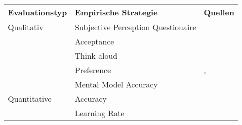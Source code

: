 \begin{table}[htb!]
    \begin{center}
        \begin{tabular}{|p{}|p{}|p{}|}
            \hline
            \textbf{Evaluationstyp} & \textbf{Empirische Strategie} & \textbf{Quellen} \\ \hline
            Qualitativ  & Subjective Perception Questionaire &  \cite{balog_measuring_2020} \cite{sato_context_nodate}
                                                                \cite{waa_evaluating_2021} \cite{eiband_impact_2019}  \cite{kouki_user_2017} \cite{tsai_evaluating_2019}
                                                                \cite{hernandez-bocanegra_effects_2020}
                                                                \cite{zahedi_towards_2019} \cite{tsai_effects_2020} 
                                                                \cite{ribera2019can} \\
                        & Acceptance                        & \cite{tintarev_designing_nodate}
                                                            \cite{hernandez-bocanegra_effects_2020}
                                                            \cite{kunkel_let_2019} \\
                        & Think aloud                       & \cite{wiegand_id_2020} \cite{yamada_evaluating_2016} \\
                        & Preference                        & \cite{kouki_user_2017} \cite{mucha_interfaces_2021} 
                                                            \cite{abdulrahman_belief-based_2019} 
                                                            \cite{waa_evaluating_2021} \cite{wiegand_id_2020} ,
                                                            \cite{stange_effects_2021} \cite{kaptein_personalised_2017} \\
                        & Mental Model Accuracy             & \cite{gunning2019darpa} \\
            \hline
            Quantitative& Accuracy                          & \cite{tintarev_designing_nodate}
                                                            \cite{waa_evaluating_2021} \cite{mucha_interfaces_2021}
                                                            \cite{kunkel_let_2019} \cite{zolotas_towards_2019} \\
                        & Learning Rate                     & \cite{tintarev_designing_nodate} \cite{gunning2019darpa} \\

\end{tabular}
\end{center}
\end{table}
